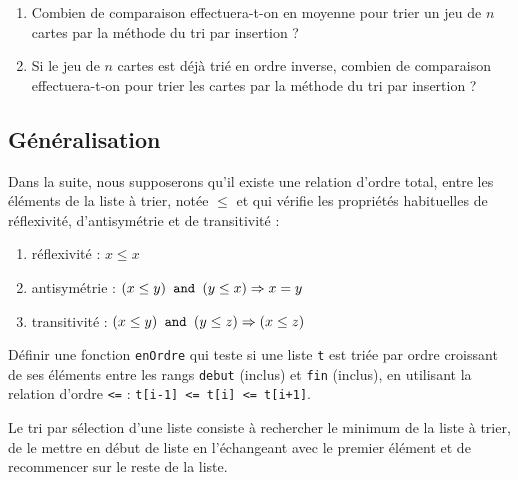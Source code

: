\begin{question}\mbox{}
\begin{enumerate}
\item Combien de comparaison effectuera-t-on en moyenne pour trier un jeu de $n$ cartes 
	par la méthode du tri par insertion ?
\item Si le jeu de $n$ cartes est déjà trié en ordre inverse, combien de comparaison 
	effectuera-t-on pour trier les cartes par la méthode du tri par insertion ?
\end{enumerate}
\end{question}

\subsection{Généralisation}
Dans la suite, nous supposerons qu'il existe une relation d'ordre total, 
entre les éléments de la liste à trier, notée $\leq$ et qui vérifie les propriétés 
habituelles de réflexivité, d'antisymétrie et de transitivité :
\begin{enumerate}
\item réflexivité : $x \leq x$
\item antisymétrie : $(x \leq y) \mbox{\tt\ and\ } (y \leq x) \Rightarrow x = y$
\item transitivit\'e : $(x \leq y) \mbox{\tt\ and\ } (y \leq z) \Rightarrow (x \leq z)$
\end{enumerate}


\begin{question}
Définir une fonction \texttt{enOrdre} qui teste si une liste \texttt{t} est triée par ordre croissant de ses
éléments entre les rangs \texttt{debut} (inclus) et \texttt{fin} (inclus), 
en utilisant la relation d'ordre \texttt{<=} : \texttt{t[i-1] <= t[i] <= t[i+1]}.
\end{question}

Le tri par sélection d'une liste consiste à rechercher le minimum de la liste
à trier, de le mettre en début de liste en l'échangeant avec le premier élément
et de recommencer sur le reste de la liste.

